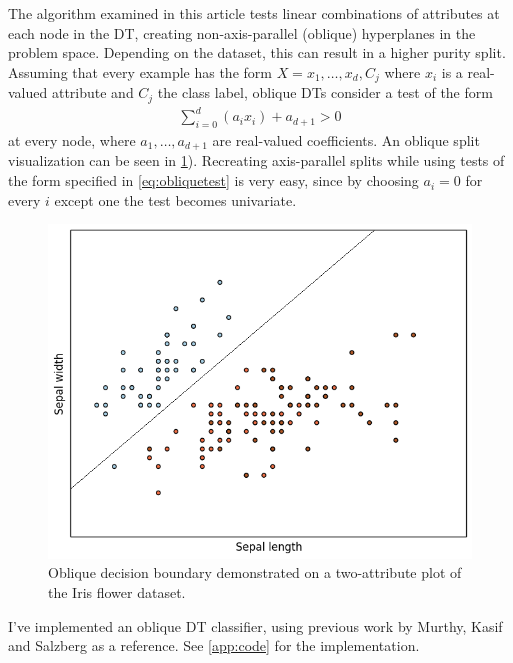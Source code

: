 \documentclass[12pt]{article}
\begin{document}
The algorithm examined in this article tests linear combinations of attributes at each node in the DT, creating non-axis-parallel (oblique) hyperplanes in the problem space. Depending on the dataset, this can result in a higher purity split. Assuming that every example has the form $X = x_1, \ldots, x_d, C_j$ where $x_i$ is a real-valued attribute and $C_j$ the class label, oblique DTs consider a test of the form
\begin{align} \label{eq:obliquetest}
\sum\limits_{i = 0}^{d} (a_i x_i) + a_{d + 1} > 0
\end{align}
at every node, where $a_1, \ldots, a_{d + 1}$ are real-valued coefficients. An oblique split visualization can be seen in \cref{fig:obliquesplit}). Recreating axis-parallel splits while using tests of the form specified in \cref{eq:obliquetest} is very easy, since by choosing $a_i = 0$ for every $i$ except one the test becomes univariate.

\begin{figure}[!ht]
\centering
\includegraphics[scale=0.4]{images/sepal_length-sepal_width-withline.png}
\caption{Oblique decision boundary demonstrated on a two-attribute plot of the Iris flower dataset.}
\label{fig:obliquesplit}
\end{figure}

I've implemented an oblique DT classifier, using previous work by Murthy, Kasif and Salzberg \cite{KSM:1994} as a reference. See \cref{app:code} for the implementation.
\end{document}
